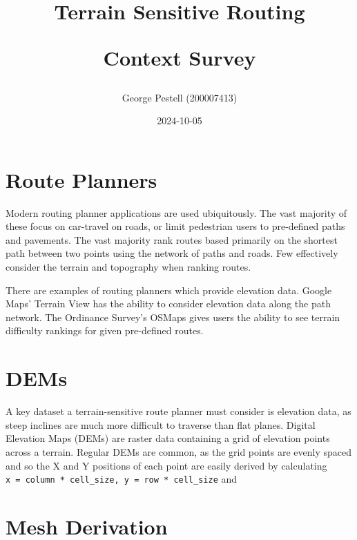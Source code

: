 \documentclass[
]{article}
\title{Terrain Sensitive Routing

Context Survey}
\author{George Pestell (200007413)}
\date{2024-10-05}
\begin{document}
\maketitle

\hypertarget{route-planners}{%
\section{Route Planners}\label{route-planners}}

Modern routing planner applications are used ubiquitously. The vast
majority of these focus on car-travel on roads, or limit pedestrian
users to pre-defined paths and pavements. The vast majority rank routes
based primarily on the shortest path between two points using the
network of paths and roads. Few effectively consider the terrain and
topography when ranking routes.

There are examples of routing planners which provide elevation data.
Google Maps' Terrain View has the ability to consider elevation data
along the path network. The Ordinance Survey's OSMaps gives users the
ability to see terrain difficulty rankings for given pre-defined routes.

\hypertarget{dems}{%
\section{DEMs}\label{dems}}

A key dataset a terrain-sensitive route planner must consider is
elevation data, as steep inclines are much more difficult to traverse
than flat planes. Digital Elevation Maps (DEMs) are raster data
containing a grid of elevation points across a terrain. Regular DEMs are
common, as the grid points are evenly spaced and so the X and Y
positions of each point are easily derived by calculating
\texttt{x\ =\ column\ *\ cell\_size,\ y\ =\ row\ *\ cell\_size} and

\hypertarget{mesh-derivation}{%
\section{Mesh Derivation}\label{mesh-derivation}}
\end{document}

